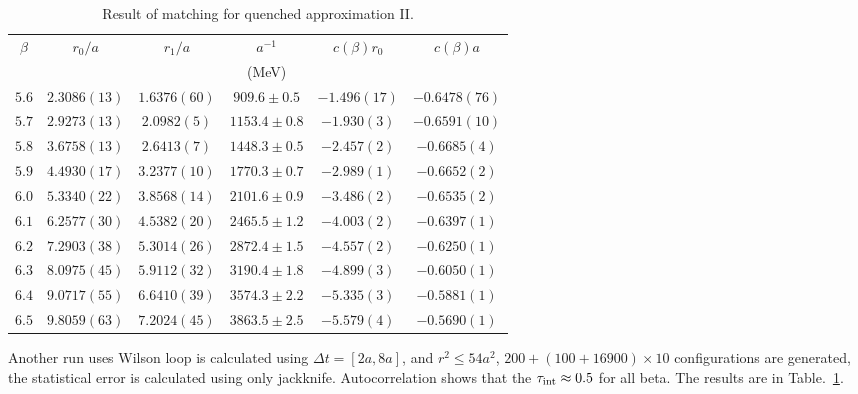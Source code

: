\begin{table}
\begin{center}
\begin{tabular}{c|c|c|c|c|c}
    \hline    
$\beta$ & $r_0/a$ & $r_1/a$ & $a^{-1}$ & $c(\beta)r_0$ & $c(\beta)a$\\
& & & (MeV) & & \\
\hline
$5.6$ & $2.3086(13)$ & $1.6376(60)$  & $ 909.6\pm0.5$ & $-1.496(17)$ & $-0.6478(76)$\\
\hline
$5.7$ & $2.9273(13)$  & $2.0982(5)$  & $1153.4\pm0.8$ & $-1.930(3)$  & $-0.6591(10)$\\
\hline
$5.8$ & $3.6758(13)$  & $2.6413(7)$  & $1448.3\pm0.5$ & $-2.457(2)$  & $-0.6685(4)$\\
\hline
$5.9$ & $4.4930(17)$ & $3.2377(10)$  & $1770.3\pm0.7$ & $-2.989(1)$  & $-0.6652(2)$\\ 
\hline
$6.0$ & $5.3340(22)$ & $3.8568(14)$  & $2101.6\pm0.9$ & $-3.486(2)$  & $-0.6535(2)$\\
\hline
$6.1$ & $6.2577(30)$ & $4.5382(20)$  & $2465.5\pm1.2$ & $-4.003(2)$  & $-0.6397(1)$\\
\hline
$6.2$ & $7.2903(38)$ & $5.3014(26)$  & $2872.4\pm1.5$ & $-4.557(2)$  & $-0.6250(1)$\\
\hline
$6.3$ & $8.0975(45)$ & $5.9112(32)$  & $3190.4\pm1.8$ & $-4.899(3)$  & $-0.6050(1)$\\
\hline
$6.4$ & $9.0717(55)$ & $6.6410(39)$  & $3574.3\pm2.2$ & $-5.335(3)$  & $-0.5881(1)$\\
\hline
$6.5$ & $9.8059(63)$ & $7.2024(45)$  & $3863.5\pm2.5$ & $-5.579(4)$  & $-0.5690(1)$\\
\hline
\end{tabular}
\end{center}
\caption{\label{tab.res.matchingquench2}Result of matching for quenched approximation II.}
\end{table}

Another run uses Wilson loop is calculated using $\Delta t = [2a, 8a]$, and $r^2\leq 54 a^2$, $200+(100+16900)\times 10$ configurations are generated, the statistical error is calculated using only jackknife.
\textcolor[rgb]{0,0,1}{Autocorrelation shows that the $\tau _{\rm int}\approx 0.5$ for all beta.}
The results are in Table.~\ref{tab.res.matchingquench2}.